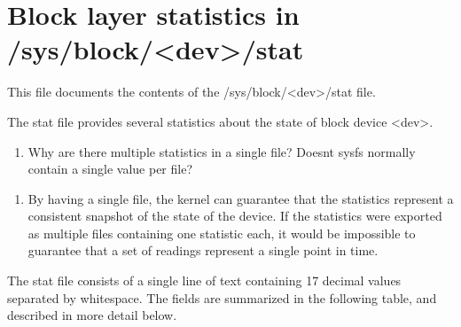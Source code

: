 \documentclass[a4paper,11pt,english]{sphinxmanual}
\begin{document}
\chapter{Block layer statistics in /sys/block/\textless{}dev\textgreater{}/stat}
\label{\detokenize{stat:block-layer-statistics-in-sys-block-dev-stat}}\label{\detokenize{stat::doc}}
This file documents the contents of the /sys/block/\textless{}dev\textgreater{}/stat file.

The stat file provides several statistics about the state of block
device \textless{}dev\textgreater{}.
\begin{enumerate}
%
\setcounter{enumi}{16}
\item {} 
Why are there multiple statistics in a single file?  Doesn\textquotesingle{}t sysfs
normally contain a single value per file?

\end{enumerate}
\begin{enumerate}
%
\item {} 
By having a single file, the kernel can guarantee that the statistics
represent a consistent snapshot of the state of the device.  If the
statistics were exported as multiple files containing one statistic
each, it would be impossible to guarantee that a set of readings
represent a single point in time.

\end{enumerate}

The stat file consists of a single line of text containing 17 decimal
values separated by whitespace.  The fields are summarized in the
following table, and described in more detail below.
\end{document}
